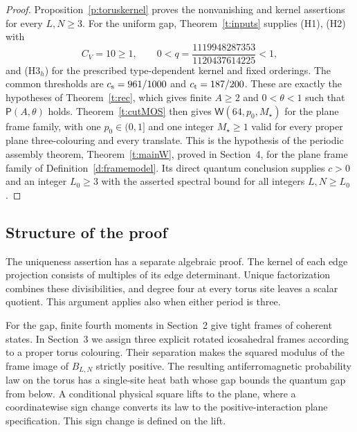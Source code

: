 \begin{proof}
Proposition~\ref{p:toruskernel} proves the nonvanishing and kernel
assertions for every \(L,N\ge3\). For the uniform gap,
Theorem~\ref{t:inputs} supplies (H1), (H2) with
\[
 C_V=10\ge1,\qquad
 0<q=\frac{1119948287353}{1120437614225}<1,
\]
and (H3\(_h\)) for the prescribed type-dependent kernel and fixed
orderings. The common thresholds are \(c_{\rm s}=961/1000\) and
\(c_{\rm t}=187/200\).
These are exactly the hypotheses of Theorem~\ref{t:rec}, which
gives finite \(A\ge2\) and \(0<\theta<1\) such that
\(\mathsf P(A,\theta)\) holds.
Theorem~\ref{t:cutMOS} then gives
\(\mathsf W(64,p_0,M_\star)\) for the plane frame family, with
one \(p_0\in(0,1]\) and one integer \(M_\star\ge1\) valid for
every proper plane three-colouring and every translate.
This is the hypothesis of the periodic assembly theorem,
Theorem~\ref{t:mainW}, proved in Section~4, for the plane frame
family of Definition~\ref{d:framemodel}. Its direct quantum
conclusion supplies \(c>0\) and an integer \(L_0\ge3\) with the
asserted spectral bound for all integers \(L,N\ge L_0\).
\end{proof}

\subsection{Structure of the proof}

The uniqueness assertion has a separate algebraic proof. The kernel
of each edge projection consists of multiples of its edge determinant.
Unique factorization combines these divisibilities, and degree four
at every torus site leaves a scalar quotient. This argument applies
also when either period is three.

For the gap, finite fourth moments in Section~2 give tight frames of
coherent states. In Section~3 we assign three explicit rotated
icosahedral frames according to a proper torus colouring. Their
separation makes the squared modulus of the frame image of
\(B_{L,N}\) strictly positive. The resulting antiferromagnetic
probability law on the torus has a single-site heat bath whose gap
bounds the quantum gap from below. A conditional physical square
lifts to the plane, where a coordinatewise sign change converts its
law to the positive-interaction plane specification. This sign
change is defined on the lift.

